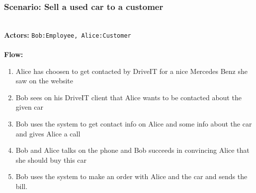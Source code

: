 \subsubsection{Scenario: Sell a used car to a customer}
\HRule \\[0.4cm]
\textbf{Actors:} \texttt{Bob:Employee, Alice:Customer}\\
\HRule \\[0.4cm]
\textbf{Flow:} \\
\begin{enumerate}
\item Alice has choosen to get contacted by DriveIT for a nice Mercedes Benz she saw on the website
\item Bob sees on his DriveIT client that Alice wants to be contacted about the given car
\item Bob uses the system to get contact info on Alice and some info about the car and gives Alice a call
\item Bob and Alice talks on the phone and Bob succeeds in convincing Alice that she should buy this car
\item Bob uses the system to make an order with Alice and the car and sends the bill.
\end{enumerate}
\HRule \\[0.4cm]